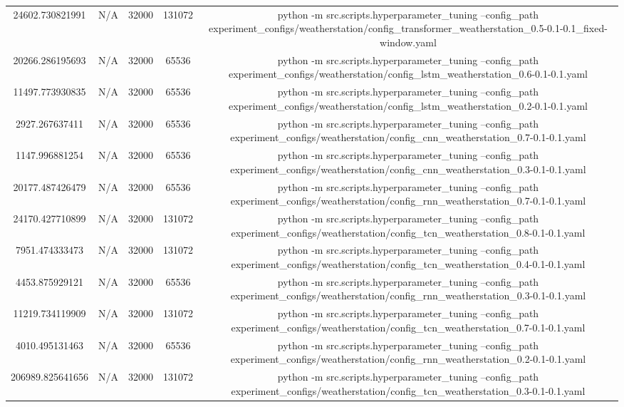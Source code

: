 \begin{table}[h]
\begin{tabular}{c | c | c | c | c}
24602.730821991 & N/A & 32000 & 131072 & python -m src.scripts.hyperparameter_tuning --config_path experiment_configs/weatherstation/config_transformer_weatherstation_0.5-0.1-0.1_fixed-window.yaml \\
20266.286195693 & N/A & 32000 & 65536 & python -m src.scripts.hyperparameter_tuning --config_path experiment_configs/weatherstation/config_lstm_weatherstation_0.6-0.1-0.1.yaml \\
11497.773930835 & N/A & 32000 & 65536 & python -m src.scripts.hyperparameter_tuning --config_path experiment_configs/weatherstation/config_lstm_weatherstation_0.2-0.1-0.1.yaml \\
2927.267637411 & N/A & 32000 & 65536 & python -m src.scripts.hyperparameter_tuning --config_path experiment_configs/weatherstation/config_cnn_weatherstation_0.7-0.1-0.1.yaml \\
1147.996881254 & N/A & 32000 & 65536 & python -m src.scripts.hyperparameter_tuning --config_path experiment_configs/weatherstation/config_cnn_weatherstation_0.3-0.1-0.1.yaml \\
20177.487426479 & N/A & 32000 & 65536 & python -m src.scripts.hyperparameter_tuning --config_path experiment_configs/weatherstation/config_rnn_weatherstation_0.7-0.1-0.1.yaml \\
24170.427710899 & N/A & 32000 & 131072 & python -m src.scripts.hyperparameter_tuning --config_path experiment_configs/weatherstation/config_tcn_weatherstation_0.8-0.1-0.1.yaml \\
7951.474333473 & N/A & 32000 & 131072 & python -m src.scripts.hyperparameter_tuning --config_path experiment_configs/weatherstation/config_tcn_weatherstation_0.4-0.1-0.1.yaml \\
4453.875929121 & N/A & 32000 & 65536 & python -m src.scripts.hyperparameter_tuning --config_path experiment_configs/weatherstation/config_rnn_weatherstation_0.3-0.1-0.1.yaml \\
11219.734119909 & N/A & 32000 & 131072 & python -m src.scripts.hyperparameter_tuning --config_path experiment_configs/weatherstation/config_tcn_weatherstation_0.7-0.1-0.1.yaml \\
4010.495131463 & N/A & 32000 & 65536 & python -m src.scripts.hyperparameter_tuning --config_path experiment_configs/weatherstation/config_rnn_weatherstation_0.2-0.1-0.1.yaml \\
206989.825641656 & N/A & 32000 & 131072 & python -m src.scripts.hyperparameter_tuning --config_path experiment_configs/weatherstation/config_tcn_weatherstation_0.3-0.1-0.1.yaml \\

\end{tabular}
\end{table}
